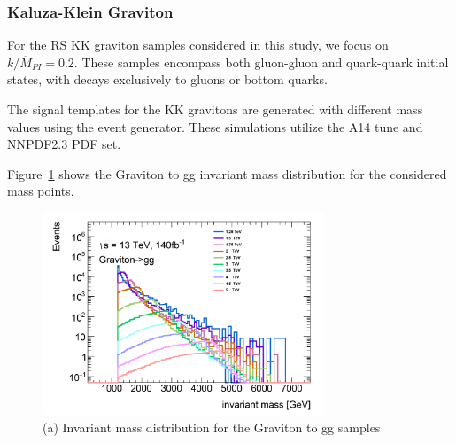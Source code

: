 %
%
%
%

\subsubsection{Kaluza-Klein Graviton}
\label{sec:kkgraviton}

For the RS KK graviton samples considered in this study, we focus on $k/\overline{M}_{PI} = 0.2$. These samples encompass both gluon-gluon and quark-quark initial states, with decays exclusively to gluons or bottom quarks.

The signal templates for the KK gravitons are generated with different mass values using the  event generator. These simulations utilize the A14 tune and NNPDF2.3 PDF set.

Figure~\ref{fig:Ggg} shows the Graviton to gg invariant mass distribution for the considered mass points.

\begin{figure}[!h]
	\centering
\includegraphics[width=0.75\textwidth]{fig/benchmark_signals/Ggg_mjj.pdf}
	\caption{(a) Invariant mass distribution for the Graviton to gg samples
		\label{fig:Ggg}
	}
\end{figure}

